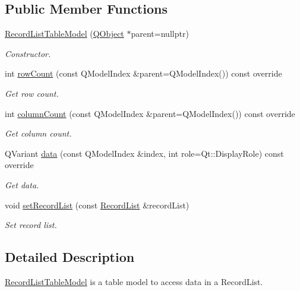 \subsection*{Public Member Functions}
\begin{DoxyCompactItemize}
\item 
\hyperlink{class_mdt_1_1_plain_text_1_1_record_list_table_model_a8f620b5691a0a5e739dbb0fbc511dc3d}{Record\+List\+Table\+Model} (\hyperlink{class_q_object}{Q\+Object} $\ast$parent=nullptr)
\begin{DoxyCompactList}\small\item\em Constructor. \end{DoxyCompactList}\item 
int \hyperlink{class_mdt_1_1_plain_text_1_1_record_list_table_model_a008f00dbfb47b039abaee9a23285ed91}{row\+Count} (const Q\+Model\+Index \&parent=Q\+Model\+Index()) const override
\begin{DoxyCompactList}\small\item\em Get row count. \end{DoxyCompactList}\item 
int \hyperlink{class_mdt_1_1_plain_text_1_1_record_list_table_model_a92b06d3a99bc39778893ea45c41e294d}{column\+Count} (const Q\+Model\+Index \&parent=Q\+Model\+Index()) const override
\begin{DoxyCompactList}\small\item\em Get column count. \end{DoxyCompactList}\item 
Q\+Variant \hyperlink{class_mdt_1_1_plain_text_1_1_record_list_table_model_a21f6d39cf524905be29c3668054d7cc5}{data} (const Q\+Model\+Index \&index, int role=Qt\+::\+Display\+Role) const override
\begin{DoxyCompactList}\small\item\em Get data. \end{DoxyCompactList}\item 
void \hyperlink{class_mdt_1_1_plain_text_1_1_record_list_table_model_ad12757d9766a6e1530cfeb20039dfff6}{set\+Record\+List} (const \hyperlink{class_mdt_1_1_plain_text_1_1_record_list_template}{Record\+List} \&record\+List)
\begin{DoxyCompactList}\small\item\em Set record list. \end{DoxyCompactList}\end{DoxyCompactItemize}


\subsection{Detailed Description}
\hyperlink{class_mdt_1_1_plain_text_1_1_record_list_table_model}{Record\+List\+Table\+Model} is a table model to access data in a Record\+List. 

